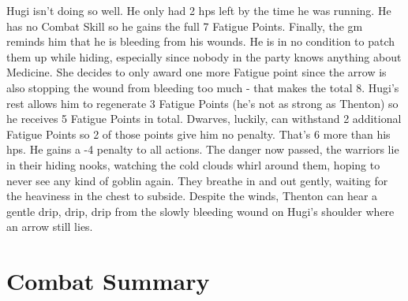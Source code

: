 \begin{multicols}{2}
{\begin{exampletext}
	Hugi isn't doing so well. He only had 2 \glspl{hp} left by the time he was running.
	He has no Combat Skill so he gains the full 7 Fatigue Points.
	Finally, the \gls{gm} reminds him that he is bleeding from his wounds.
	He is in no condition to patch them up while hiding, especially since nobody in the party knows anything about Medicine.
	She decides to only award one more Fatigue point since the arrow is also stopping the wound from bleeding too much - that makes the total 8.
	Hugi's rest allows him to regenerate 3 Fatigue Points (he's not as strong as Thenton) so he receives 5 Fatigue Points in total.
	Dwarves, luckily, can withstand 2 additional Fatigue Points so 2 of those points give him no penalty.
	That's 6 more than his \glspl{hp}.
	He gains a -4 penalty to all actions.
	The danger now passed, the warriors lie in their hiding nooks, watching the cold clouds whirl around them, hoping to never see any kind of goblin again.
	They breathe in and out gently, waiting for the heaviness in the chest to subside. Despite the winds, Thenton can hear a gentle drip, drip, drip from the slowly bleeding wound on Hugi's shoulder where an arrow still lies.
	\end{exampletext}
}{}

\end{multicols}

\section{Combat Summary}

